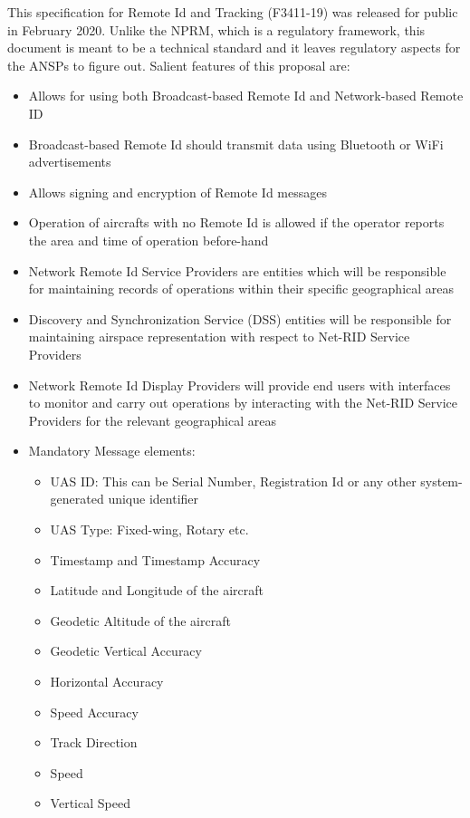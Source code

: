 \documentclass{ua_wgs_base}
\begin{document}
This specification for Remote Id and Tracking (F3411-19) \cite{ASTM:F3411:19}
was released for public in February 2020. Unlike the NPRM, which is
a regulatory framework, this document is meant to be a technical standard
and it leaves regulatory aspects for the ANSPs to figure out. Salient
features of this proposal are:
\begin{itemize}
\item Allows for using both Broadcast-based Remote Id and Network-based
Remote ID
\item Broadcast-based Remote Id should transmit data using Bluetooth or
WiFi advertisements
\item Allows signing and encryption of Remote Id messages
\item Operation of aircrafts with no Remote Id is allowed if the operator
reports the area and time of operation before-hand
\item Network Remote Id Service Providers are entities which will be responsible
for maintaining records of operations within their specific geographical
areas
\item Discovery and Synchronization Service (DSS) entities will be responsible
for maintaining airspace representation with respect to Net-RID Service
Providers
\item Network Remote Id Display Providers will provide end users with interfaces
to monitor and carry out operations by interacting with the Net-RID
Service Providers for the relevant geographical areas
\item Mandatory Message elements:
\begin{itemize}
\item UAS ID: This can be Serial Number, Registration Id or any other system-generated
unique identifier
\item UAS Type: Fixed-wing, Rotary etc.
\item Timestamp and Timestamp Accuracy
\item Latitude and Longitude of the aircraft
\item Geodetic Altitude of the aircraft
\item Geodetic Vertical Accuracy
\item Horizontal Accuracy
\item Speed Accuracy
\item Track Direction
\item Speed
\item Vertical Speed
\end{itemize}
\end{itemize}
\end{document}
